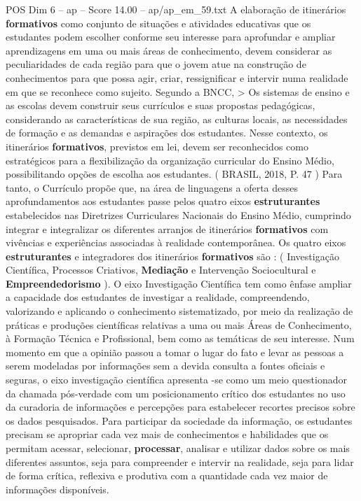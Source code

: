 \begin{textsample}{POS Dim 6 – ap – Score 14.00 – ap/ap\_em\_59.txt}
A elaboração de itinerários \textbf{formativos} como conjunto de situações e atividades educativas que os estudantes podem escolher conforme seu interesse para aprofundar e ampliar aprendizagens em uma ou mais áreas de conhecimento, devem considerar as peculiaridades de cada região para que o jovem atue na construção de conhecimentos para que possa agir, criar, ressignificar e intervir numa realidade em que se reconhece como sujeito.
Segundo a BNCC, > Os sistemas de ensino e as escolas devem construir seus currículos e suas propostas pedagógicas, considerando as características de sua região, as culturas locais, as necessidades de formação e as demandas e aspirações dos estudantes.
Nesse contexto, os itinerários \textbf{formativos}, previstos em lei, devem ser reconhecidos como estratégicos para a flexibilização da organização curricular do Ensino Médio, possibilitando opções de escolha aos estudantes. ( BRASIL, 2018, P. 47 ) Para tanto, o Currículo propõe que, na área de linguagens a oferta desses aprofundamentos aos estudantes passe pelos quatro eixos \textbf{estruturantes} estabelecidos nas Diretrizes Curriculares Nacionais do Ensino Médio, cumprindo integrar e integralizar os diferentes arranjos de itinerários \textbf{formativos} com vivências e experiências associadas à realidade contemporânea.
Os quatro eixos \textbf{estruturantes} e integradores dos itinerários \textbf{formativos} são : ( Investigação Científica, Processos Criativos, \textbf{Mediação} e Intervenção Sociocultural e \textbf{Empreendedorismo} ).
O eixo Investigação Científica tem como ênfase ampliar a capacidade dos estudantes de investigar a realidade, compreendendo, valorizando e aplicando o conhecimento sistematizado, por meio da realização de práticas e produções científicas relativas a uma ou mais Áreas de Conhecimento, à Formação Técnica e Profissional, bem como as temáticas de seu interesse.
Num momento em que a opinião passou a tomar o lugar do fato e levar as pessoas a serem modeladas por informações sem a devida consulta a fontes oficiais e seguras, o eixo investigação científica apresenta -se como um meio questionador da chamada pós-verdade com um posicionamento crítico dos estudantes no uso da curadoria de informações e percepções para estabelecer recortes precisos sobre os dados pesquisados.
Para participar da sociedade da informação, os estudantes precisam se apropriar cada vez mais de conhecimentos e habilidades que os permitam acessar, selecionar, \textbf{processar}, analisar e utilizar dados sobre os mais diferentes assuntos, seja para compreender e intervir na realidade, seja para lidar de forma crítica, reflexiva e produtiva com a quantidade cada vez maior de informações disponíveis.

\end{textsample}
